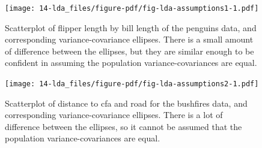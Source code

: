 \documentclass[
  letterpaper,
]{krantz}
\newenvironment{Shaded}{\begin{snugshade}}{\end{snugshade}}
\newcommand{\AttributeTok}[1]{\textcolor[rgb]{0.40,0.45,0.13}{#1}}
\newcommand{\CommentTok}[1]{\textcolor[rgb]{0.37,0.37,0.37}{#1}}
\newcommand{\ConstantTok}[1]{\textcolor[rgb]{0.56,0.35,0.01}{#1}}
\newcommand{\ControlFlowTok}[1]{\textcolor[rgb]{0.00,0.23,0.31}{#1}}
\newcommand{\DecValTok}[1]{\textcolor[rgb]{0.68,0.00,0.00}{#1}}
\newcommand{\FloatTok}[1]{\textcolor[rgb]{0.68,0.00,0.00}{#1}}
\newcommand{\FunctionTok}[1]{\textcolor[rgb]{0.28,0.35,0.67}{#1}}
\newcommand{\NormalTok}[1]{\textcolor[rgb]{0.00,0.23,0.31}{#1}}
\newcommand{\OtherTok}[1]{\textcolor[rgb]{0.00,0.23,0.31}{#1}}
\newcommand{\SpecialCharTok}[1]{\textcolor[rgb]{0.37,0.37,0.37}{#1}}
\begin{document}
\begin{Shaded}
\end{Shaded}

\begin{figure}

{\centering \texttt{[image: 14-lda\_files/figure-pdf/fig-lda-assumptions1-1.pdf]}

}

\caption{\label{fig-lda-assumptions1}Scatterplot of flipper length by
bill length of the penguins data, and corresponding variance-covariance
ellipses. There is a small amount of difference between the ellipses,
but they are similar enough to be confident in assuming the population
variance-covariances are equal.}

\end{figure}

\begin{figure}

{\centering \texttt{[image: 14-lda\_files/figure-pdf/fig-lda-assumptions2-1.pdf]}

}

\caption{\label{fig-lda-assumptions2}Scatterplot of distance to cfa and
road for the bushfires data, and corresponding variance-covariance
ellipses. There is a lot of difference between the ellipses, so it
cannot be assumed that the population variance-covariances are equal.}

\end{figure}
\end{document}
